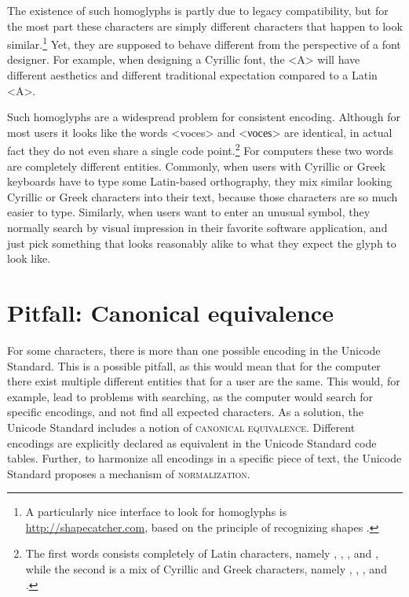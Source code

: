 The existence of such homoglyphs is partly due to legacy compatibility, but for
the most part these characters are simply different characters that happen to
look similar.\footnote{A particularly nice interface to look for homoglyphs is
\url{http://shapecatcher.com}, based on the principle of recognizing shapes
\citep{Belongie2002}.} Yet, they are supposed to behave different from the
perspective of a font designer. For example, when designing a Cyrillic font, the
<A> will have different aesthetics and different traditional expectation
compared to a Latin <A>.

Such homoglyphs are a widespread problem for consistent encoding. Although for
most users it looks like the words <voces> and <νοсеѕ> are identical, in actual
fact they do not even share a single code point.\footnote{The first words
consists completely of Latin characters, namely , ,
,  and , while the second is a mix of Cyrillic and
Greek characters, namely , , ,  and
.} For computers these two words are completely different entities.
Commonly, when users with Cyrillic or Greek keyboards have to type some
Latin-based orthography, they mix similar looking Cyrillic or Greek characters
into their text, because those characters are so much easier to type. Similarly,
when users want to enter an unusual symbol, they normally search by visual
impression in their favorite software application, and just pick something that
looks reasonably alike to what they expect the glyph to look like.

\section{Pitfall: Canonical equivalence}
\label{pitfall-canonical-equivalence}

For some characters, there is more than one possible encoding in the Unicode
Standard. This is a possible pitfall, as this would mean that for the computer
there exist multiple different entities that for a user are the same. This
would, for example, lead to problems with searching, as the computer would
search for specific encodings, and not find all expected characters. As a
solution, the Unicode Standard includes a notion of \textsc{canonical
equivalence}. Different encodings are explicitly declared as equivalent in the
Unicode Standard code tables. Further, to harmonize all encodings in a specific
piece of text, the Unicode Standard proposes a mechanism of
\textsc{normalization}.

